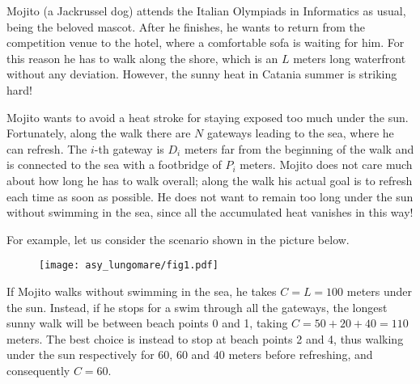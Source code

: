 \usepackage{xcolor}
\usepackage{afterpage}
\usepackage{pifont,mdframed}
\usepackage[bottom]{footmisc}

\usepackage{amsmath}
\usepackage{amsthm}
\usepackage{amssymb}
\usepackage{mathtools}


\newcommand{\inputfile}{\texttt{stdin}}
\newcommand{\outputfile}{\texttt{stdout}}

\newenvironment{warning}
  {\par\begin{mdframed}[linewidth=2pt,linecolor=gray]%
    \begin{list}{}{\leftmargin=1cm
                   \labelwidth=\leftmargin}\item[\Large\ding{43}]}
  {\end{list}\end{mdframed}\par}



	Mojito (a Jackrussel dog) attends the Italian Olympiads in Informatics as usual, being the beloved mascot.
	After he finishes, he wants to return from the competition venue to the hotel, where a comfortable sofa is waiting for him.
	For this reason he has to walk along the shore, which is an $L$ meters long waterfront without any deviation. However, the sunny heat in Catania summer is striking hard!
	
 	Mojito wants to avoid a heat stroke for staying exposed too much under the sun. Fortunately, along the walk there are $N$ gateways leading to the sea, where he can refresh. The $i$-th gateway is $D_i$ meters far from the beginning of the walk and is connected to the sea with a footbridge of $P_i$ meters.
	Mojito does not care much about how long he has to walk overall; along the walk his actual goal is to refresh each time as soon as possible. He does not want to remain too long under the sun without swimming in the sea, since all the accumulated heat vanishes in this way!
	
	For example, let us consider the scenario shown in the picture below.
	\begin{figure}[!h]
	\centering
	\texttt{[image: asy\_lungomare/fig1.pdf]}
	\end{figure}
	
	If Mojito walks without swimming in the sea, he takes $C = L = 100$ meters under the sun. Instead, if he stops for a swim through all the gateways, the longest sunny walk will be between beach points 0 and 1, taking $C = 50+20+40 = 110$ meters. The best choice is instead to stop at beach points 2 and 4, thus walking under the sun respectively for $60$, $60$ and $40$ meters before refreshing, and consequently $C = 60$.
	
